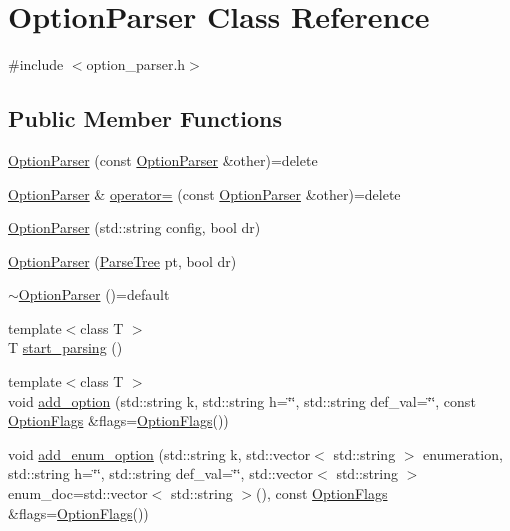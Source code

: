 \hypertarget{classOptionParser}{\section{Option\-Parser Class Reference}
\label{classOptionParser}
}


{\ttfamily \#include $<$option\-\_\-parser.\-h$>$}

\subsection*{Public Member Functions}
\begin{DoxyCompactItemize}
\item 
\hyperlink{classOptionParser_a7d2b6253b2983dd75a9b0283eb4fa7db}{Option\-Parser} (const \hyperlink{classOptionParser}{Option\-Parser} \&other)=delete
\item 
\hyperlink{classOptionParser}{Option\-Parser} \& \hyperlink{classOptionParser_a2e2cc30fc30f02cb1059dd1a1e639190}{operator=} (const \hyperlink{classOptionParser}{Option\-Parser} \&other)=delete
\item 
\hyperlink{classOptionParser_a01c819c971ca8f7bc4d876f308f3b000}{Option\-Parser} (std\-::string config, bool dr)
\item 
\hyperlink{classOptionParser_a37bd36531915d20f1273682377c1c53a}{Option\-Parser} (\hyperlink{option__parser__util_8h_aec975d670a266efbd55f05ed9f9baf9a}{Parse\-Tree} pt, bool dr)
\item 
\hyperlink{classOptionParser_a478fba32ec6cc9aeafeb55c33c600603}{$\sim$\-Option\-Parser} ()=default
\item 
{\footnotesize template$<$class T $>$ }\\T \hyperlink{classOptionParser_a672b8b902d2c30dcb54c5d8a5481baaa}{start\-\_\-parsing} ()
\item 
{\footnotesize template$<$class T $>$ }\\void \hyperlink{classOptionParser_aecacb6728fc2e135f1c012b05c3e05ae}{add\-\_\-option} (std\-::string k, std\-::string h=\char`\"{}\char`\"{}, std\-::string def\-\_\-val=\char`\"{}\char`\"{}, const \hyperlink{structOptionFlags}{Option\-Flags} \&flags=\hyperlink{structOptionFlags}{Option\-Flags}())
\item 
void \hyperlink{classOptionParser_a903c91ec09488a50cc3faa9b5257d1de}{add\-\_\-enum\-\_\-option} (std\-::string k, std\-::vector$<$ std\-::string $>$ enumeration, std\-::string h=\char`\"{}\char`\"{}, std\-::string def\-\_\-val=\char`\"{}\char`\"{}, std\-::vector$<$ std\-::string $>$ enum\-\_\-doc=std\-::vector$<$ std\-::string $>$(), const \hyperlink{structOptionFlags}{Option\-Flags} \&flags=\hyperlink{structOptionFlags}{Option\-Flags}())

\end{DoxyCompactItemize}
